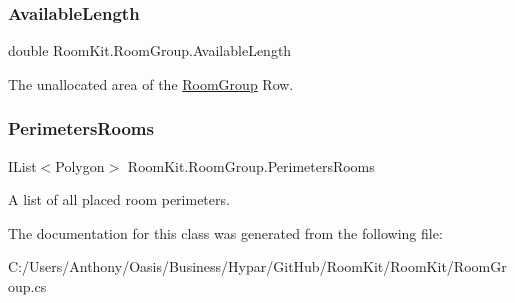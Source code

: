 \mbox{\label{class_room_kit_1_1_room_group_ac1598a6191029a361787fe7d01bd2c94}} 
\subsubsection{\texorpdfstring{Available\+Length}{AvailableLength}}
{\footnotesize\ttfamily double Room\+Kit.\+Room\+Group.\+Available\+Length\hspace{0.3cm}{\ttfamily [get]}}



The unallocated area of the \mbox{\hyperlink{class_room_kit_1_1_room_group}{Room\+Group}} Row. 

\mbox{\label{class_room_kit_1_1_room_group_ac489ddfd60ab7b2bbb894607d8271dc3}} 
\subsubsection{\texorpdfstring{Perimeters\+Rooms}{PerimetersRooms}}
{\footnotesize\ttfamily I\+List$<$Polygon$>$ Room\+Kit.\+Room\+Group.\+Perimeters\+Rooms\hspace{0.3cm}{\ttfamily [get]}}



A list of all placed room perimeters. 



The documentation for this class was generated from the following file\+:\begin{DoxyCompactItemize}
\item 
C\+:/\+Users/\+Anthony/\+Oasis/\+Business/\+Hypar/\+Git\+Hub/\+Room\+Kit/\+Room\+Kit/Room\+Group.\+cs\end{DoxyCompactItemize}
